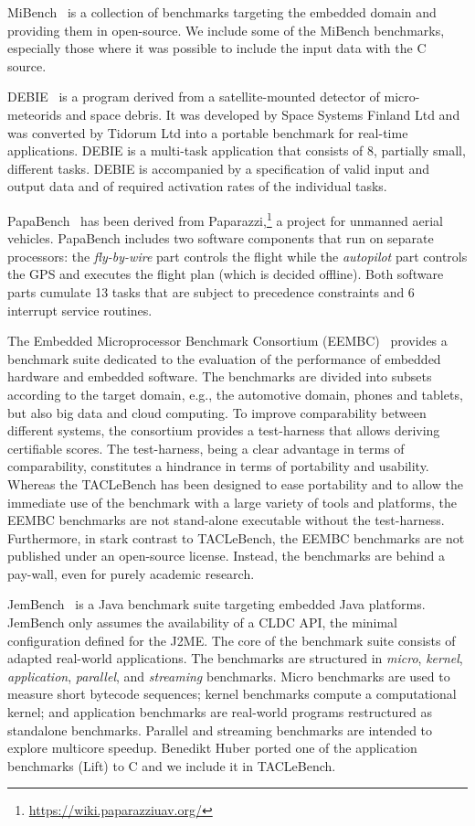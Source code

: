 \documentclass[a4paper,UKenglish]{oasics-v2016}
\newcommand{\martin}[1]{{\color{blue} Martin: #1}}
\renewcommand{\martin}[1]{}
\begin{document}
MiBench~\cite{MiBench} is a collection of benchmarks targeting the embedded
domain and providing them in open-source.
We include some of the MiBench benchmarks, especially
those where it was possible to include the input data with the C source.

DEBIE~\cite{debie} is a program derived from a satellite-mounted detector of micro-meteorids and space debris.
It was developed by Space Systems Finland Ltd and was converted by Tidorum Ltd into a portable benchmark for real-time applications.
DEBIE is a multi-task application that consists of 8, partially small, different tasks.
DEBIE is accompanied by a specification of valid input and output data and of required activation rates of the individual tasks.

PapaBench~\cite{papabench} has been derived from  Paparazzi,\footnote{\url{https://wiki.paparazziuav.org/}}
a project for unmanned aerial vehicles.  PapaBench includes
two software components that run on separate processors:
the \textit{fly-by-wire} part controls the flight while the \textit{autopilot} part controls the GPS and
executes the flight plan (which is decided offline). Both software parts  cumulate 13 tasks that are subject
to precedence constraints and 6 interrupt service routines.

The Embedded Microprocessor Benchmark Consortium (EEMBC)~\cite{eembc} provides a
benchmark suite dedicated to the evaluation of
the performance of embedded hardware and embedded software.
The benchmarks are divided into subsets according to the target domain, e.g., the automotive domain, phones and tablets, but also big data and cloud computing.
To improve comparability between different systems, the consortium provides a
test-harness that allows deriving certifiable scores.
The test-harness, being a clear advantage in terms of comparability,
constitutes a hindrance in terms of portability and usability.
Whereas the TACLeBench has been designed to ease portability and to allow the immediate use of the benchmark with a large variety of tools and platforms, the EEMBC benchmarks are not stand-alone executable without the test-harness.
Furthermore, in stark contrast to TACLeBench, the EEMBC benchmarks are not published under an open-source license.
Instead, the benchmarks are behind a pay-wall, even for purely academic research.


JemBench~\cite{jembench} is a Java benchmark suite targeting
embedded Java platforms. JemBench only assumes the
availability of a CLDC API, the minimal configuration
defined for the J2ME. The core of the benchmark suite consists of
adapted real-world applications.
The benchmarks are structured in {\em micro}, {\em kernel}, {\em
application}, {\em parallel}, and {\em streaming} benchmarks.
Micro benchmarks are used to measure short bytecode sequences;
kernel benchmarks compute a computational kernel; and application
benchmarks are real-world programs restructured as standalone benchmarks.
Parallel and streaming benchmarks are intended to explore multicore
speedup.
Benedikt Huber ported one of the application benchmarks (Lift) to C
and we include it in TACLeBench.
\end{document}
